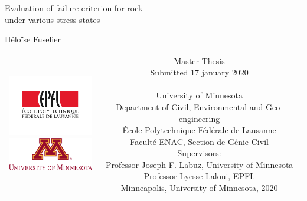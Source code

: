 
\begin{titlepage}
    \begin{center}
    \sffamily
    
    
    \null\vspace{2cm}
    {\huge Evaluation of failure criterion for rock \\[12pt] under various stress states} \\[24pt] 
    
    \vspace{3cm}
    
    {\LARGE Héloïse Fuselier}
        
    \vfill
    
    \begin{tabular} {cc}
    \parbox{0.3\textwidth}{\includegraphics[width=4cm]
    {images/epfl} \\[30pt]
    \includegraphics[width=4cm]
    {images/UofM2}}
    &
    \parbox{0.7\textwidth}{
        Master Thesis \\
        Submitted 17 january 2020\\
        \\
        University of Minnesota\\
        Department of Civil, Environmental and Geo-engineering \\
        École Polytechnique Fédérale de Lausanne\\
        Faculté ENAC, Section de Génie-Civil\\[6pt]
        
        
    
        Supervisors:\\[4pt]
        Professor Joseph F. Labuz, University of Minnesota\\    
        Professor Lyesse Laloui, EPFL\\[12pt]
            
        Minneapolis, University of Minnesota, 2020}
    \end{tabular}
    \end{center}
    \vspace{1cm}
    \end{titlepage}
    